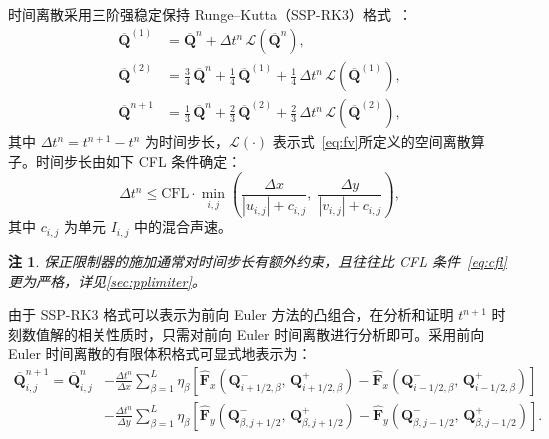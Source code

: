 \documentclass[12pt,a4paper]{article}
\newtheorem{remark}[theorem]{注}
\numberwithin{equation}{section}    %
\begin{document}
时间离散采用三阶强稳定保持 Runge--Kutta（SSP-RK3）格式~\cite{gottlieb2001strong}：
\begin{equation}
    \label{eq:ssprk}
    \begin{aligned}
        \overline{\bm{Q}}^{(1)}   & = \overline{\bm{Q}}^n
        + \Delta t^n\, \mathcal{L}(\overline{\bm{Q}}^n),                                                                   \\
        \overline{\bm{Q}}^{(2)}   & = \frac{3}{4}\,\overline{\bm{Q}}^n
        + \frac{1}{4}\,\overline{\bm{Q}}^{(1)}
        + \frac{1}{4}\,\Delta t^n\, \mathcal{L}(\overline{\bm{Q}}^{(1)}),                                                  \\
        \overline{\bm{Q}}^{n+1}   & = \frac{1}{3}\,\overline{\bm{Q}}^n
        + \frac{2}{3}\,\overline{\bm{Q}}^{(2)}
        + \frac{2}{3}\,\Delta t^n\, \mathcal{L}(\overline{\bm{Q}}^{(2)}),
    \end{aligned}
\end{equation}
其中 $\Delta t^n = t^{n+1} - t^n$ 为时间步长，$\mathcal{L}(\cdot)$ 表示式~\eqref{eq:fv}所定义的空间离散算子。时间步长由如下 CFL 条件确定：
\begin{equation}
    \label{eq:cfl}
    \Delta t^n \leqslant \mathrm{CFL} \cdot
    \min_{i,j} \left(
    \frac{\Delta x}{|u_{i,j}| + c_{i,j}},\;
    \frac{\Delta y}{|v_{i,j}| + c_{i,j}}
    \right),
\end{equation}
其中 $c_{i,j}$ 为单元 $I_{i,j}$ 中的混合声速。

\begin{remark}
    保正限制器的施加通常对时间步长有额外约束，且往往比 CFL 条件~\eqref{eq:cfl}更为严格，详见\autoref{sec:pplimiter}。
\end{remark}

由于 SSP-RK3 格式可以表示为前向 Euler 方法的凸组合，在分析和证明 $t^{n+1}$ 时刻数值解的相关性质时，只需对前向 Euler 时间离散进行分析即可。采用前向 Euler 时间离散的有限体积格式可显式地表示为：
\begin{equation}
    \label{eq:fv_euler}
    \begin{aligned}
        \overline{\bm{Q}}_{i,j}^{n+1}
        = \overline{\bm{Q}}_{i,j}^n
         & - \frac{\Delta t^n}{\Delta x} \sum_{\beta=1}^{L} \eta_{\beta}
        \left[
            \hat{\bm{F}}_x\!\left(\bm{Q}_{i+1/2,\beta}^-,\, \bm{Q}_{i+1/2,\beta}^+\right)
            - \hat{\bm{F}}_x\!\left(\bm{Q}_{i-1/2,\beta}^-,\, \bm{Q}_{i-1/2,\beta}^+\right)
        \right]  \\
         & - \frac{\Delta t^n}{\Delta y} \sum_{\beta=1}^{L} \eta_{\beta}
        \left[
            \hat{\bm{F}}_y\!\left(\bm{Q}_{\beta,j+1/2}^-,\, \bm{Q}_{\beta,j+1/2}^+\right)
            - \hat{\bm{F}}_y\!\left(\bm{Q}_{\beta,j-1/2}^-,\, \bm{Q}_{\beta,j-1/2}^+\right)
        \right].
    \end{aligned}
\end{equation}
\end{document}
